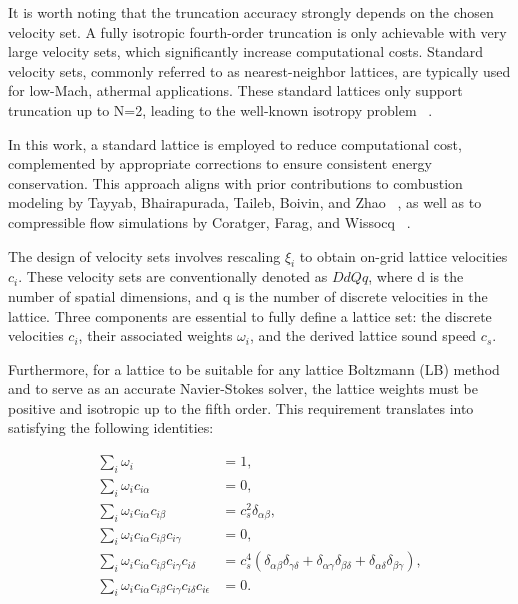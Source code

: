 It is worth noting that the truncation accuracy strongly depends on the chosen
velocity set. A fully isotropic fourth-order truncation is only achievable with
very large velocity sets, which significantly increase computational costs.
Standard velocity sets, commonly referred to as nearest-neighbor lattices,
are typically used for low-Mach, athermal applications. These standard lattices
only support truncation up to N=2, leading to the well-known isotropy problem
~\cite{kruger2017lattice}.

In this work, a standard lattice is employed to reduce computational cost,
complemented by appropriate corrections to ensure consistent energy
conservation. This approach aligns with prior contributions to combustion
modeling by Tayyab, Bhairapurada, Taileb, Boivin, and Zhao
~\cite{tayyab2020hybrid, tayyab2021lattice, zhao2023lattice, taileb2022lattice},
as well as to compressible flow simulations by Coratger, Farag, and Wissocq
~\cite{coratger2021large, wissocq2022restoring, zhao2020toward}.

The design of velocity sets involves rescaling $\xi_i$ to obtain on-grid lattice
velocities $c_i$. These velocity sets are conventionally denoted as $DdQq$,
where d is the number of spatial dimensions, and q is the number of discrete
velocities in the lattice. Three components are essential to fully define a
lattice set: the discrete velocities $c_i$, their associated weights $\omega_i$,
and the derived lattice sound speed $c_s$.

Furthermore, for a lattice to be suitable for any lattice Boltzmann (LB) method
and to serve as an accurate Navier-Stokes solver, the lattice weights must be
positive and isotropic up to the fifth order. This requirement translates into
satisfying the following identities:

\begin{equation}
	\begin{aligned}
		\sum_i \omega_i &= 1, \\
		\sum_i \omega_i c_{i\alpha} &= 0, \\
		\sum_i \omega_i c_{i\alpha} c_{i\beta} &= c_s^2 \delta_{\alpha\beta}, \\
		\sum_i \omega_i c_{i\alpha} c_{i\beta} c_{i\gamma} &= 0, \\
		\sum_i \omega_i c_{i\alpha} c_{i\beta} c_{i\gamma} c_{i\delta} &= c_s^4 (\delta_{\alpha\beta}\delta_{\gamma\delta} + \delta_{\alpha\gamma}\delta_{\beta\delta} + \delta_{\alpha\delta}\delta_{\beta\gamma}), \\
		\sum_i \omega_i c_{i\alpha} c_{i\beta} c_{i\gamma} c_{i\delta} c_{i\epsilon} &= 0.
	\end{aligned}
\end{equation}
	

